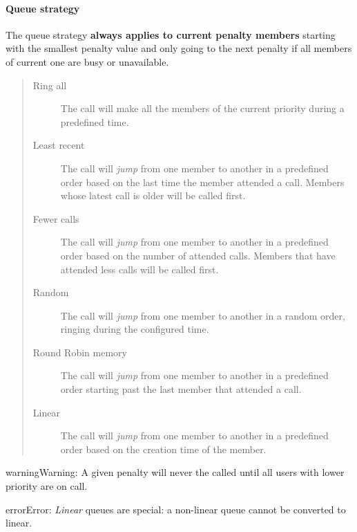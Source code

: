 \documentclass[letterpaper,10pt,english]{sphinxmanual}
\begin{document}
\paragraph{Queue strategy}
\label{administration_portal/client/vpbx/routing_endpoints/queues:queue-strategy}
The queue strategy \textbf{always applies to current penalty members} starting with
the smallest penalty value and only going to the next penalty if all members of
current one are busy or unavailable.
\begin{quote}
\begin{description}
\item[{Ring all}] \leavevmode
The call will make all the members of the current priority during a
predefined time.

\item[{Least recent}] \leavevmode
The call will \emph{jump} from one member to another in a predefined order
based on the last time the member attended a call. Members whose latest
call is older will be called first.

\item[{Fewer calls}] \leavevmode
The call will \emph{jump} from one member to another in a predefined order
based on the number of attended calls. Members that have attended less
calls will be called first.

\item[{Random}] \leavevmode
The call will \emph{jump} from one member to another in a random order,
ringing during the configured time.

\item[{Round Robin memory}] \leavevmode
The call will \emph{jump} from one member to another in a predefined order
starting past the last member that attended a call.

\item[{Linear}] \leavevmode
The call will \emph{jump} from one member to another in a predefined order
based on the creation time of the member.

\end{description}
\end{quote}

\begin{notice}{warning}{Warning:}
A given penalty will never the called until all users with lower priority are on call.
\end{notice}

\begin{notice}{error}{Error:}
\emph{Linear} queues are special: a non-linear queue cannot be converted to linear.
\end{notice}
\label{administration_portal/client/vpbx/routing_endpoints/conditional_routes:conditional-routes}
\end{document}
